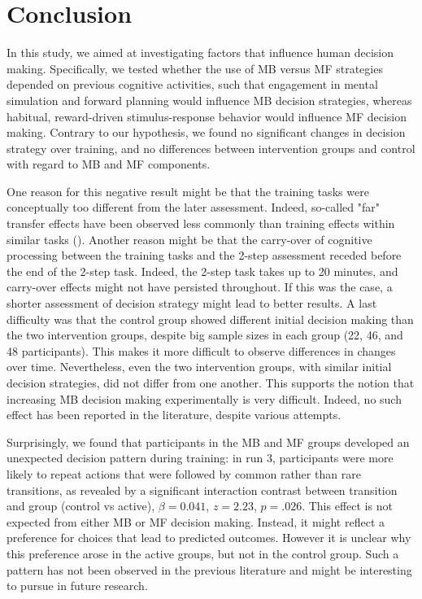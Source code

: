 \documentclass[11pt]{article} %
\begin{document}
\section{Conclusion}
In this study, we aimed at investigating factors that influence human decision making. Specifically, we tested whether the use of MB versus MF strategies depended on previous cognitive activities, such that engagement in mental simulation and forward planning would influence MB decision strategies, whereas habitual, reward-driven stimulus-response behavior would influence MF decision making. Contrary to our hypothesis, we found no significant changes in decision strategy over training, and no differences between intervention groups and control with regard to MB and MF components.

One reason for this negative result might be that the training tasks were conceptually too different from the later assessment. Indeed, so-called "far" transfer effects have been observed less commonly than training effects within similar tasks (\cite{jaeggi_short-_2011}). Another reason might be that the carry-over of cognitive processing between the training tasks and the 2-step assessment receded before the end of the 2-step task. Indeed, the 2-step task takes up to 20 minutes, and carry-over effects might not have persisted throughout. If this was the case, a shorter assessment of decision strategy might lead to better results. A last difficulty was that the control group showed different initial decision making than the two intervention groups, despite big sample sizes in each group (22, 46, and 48 participants). This makes it more difficult to observe differences in changes over time. Nevertheless, even the two intervention groups, with similar initial decision strategies, did not differ from one another. This supports the notion that increasing MB decision making experimentally is very difficult. Indeed, no such effect has been reported in the literature, despite various attempts.

Surprisingly, we found that participants in the MB and MF groups developed an unexpected decision pattern during training: in run 3, participants were more likely to repeat actions that were followed by common rather than rare transitions, as revealed by a significant interaction contrast between transition and group (control vs active), $\beta = 0.041$, $z = 2.23$, $p = .026$. This effect is not expected from either MB or MF decision making. Instead, it might reflect a preference for choices that lead to predicted outcomes. However it is unclear why this preference arose in the active groups, but not in the control group. Such a pattern has not been observed in the previous literature and might be interesting to pursue in future research.
\end{document}
